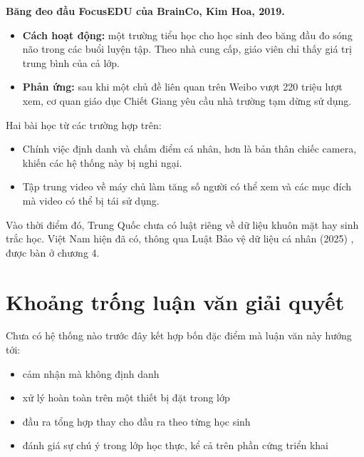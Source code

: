 \textbf{Băng đeo đầu FocusEDU của BrainCo, Kim Hoa, 2019. \cite{b11}}

\begin{itemize}
\tightlist
\item
  \textbf{Cách hoạt động:} một trường tiểu học cho học sinh đeo băng đầu đo sóng não trong các buổi luyện tập. Theo nhà cung cấp, giáo viên chỉ thấy giá trị trung bình của cả lớp.
\item
  \textbf{Phản ứng:} sau khi một chủ đề liên quan trên Weibo vượt 220 triệu lượt xem, cơ quan giáo dục Chiết Giang yêu cầu nhà trường tạm dừng sử dụng.
\end{itemize}

Hai bài học từ các trường hợp trên:

\begin{itemize}
\tightlist
\item
  Chính việc định danh và chấm điểm cá nhân, hơn là bản thân chiếc camera, khiến các hệ thống này bị nghi ngại.
\item
  Tập trung video về máy chủ làm tăng số người có thể xem và các mục đích mà video có thể bị tái sử dụng.
\end{itemize}

Vào thời điểm đó, Trung Quốc chưa có luật riêng về dữ liệu khuôn mặt hay sinh trắc học. Việt Nam hiện đã có, thông qua Luật Bảo vệ dữ liệu cá nhân (2025) \cite{b12}, được bàn ở chương 4.

\section{Khoảng trống luận văn giải quyết}

Chưa có hệ thống nào trước đây kết hợp bốn đặc điểm mà luận văn này hướng tới:

\begin{itemize}
\tightlist
\item
  cảm nhận mà không định danh
\item
  xử lý hoàn toàn trên một thiết bị đặt trong lớp
\item
  đầu ra tổng hợp thay cho đầu ra theo từng học sinh
\item
  đánh giá sự chú ý trong lớp học thực, kể cả trên phần cứng triển khai
\end{itemize}

